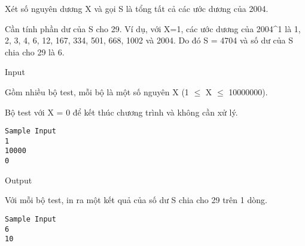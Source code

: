 



   Xét số nguyên dương X và gọi S là tổng tất cả các ước dương của 2004\textasciicircumX .  

   Cần tính phần dư của S cho 29. Ví dụ, với X=1, các ước dương của 2004\textasciicircum1 là 1, 2, 3, 4, 6, 12, 167, 334, 501, 668, 1002 và 2004. Do đó S = 4704  và số dư của S chia cho 29 là 6.  

       Input     

   Gồm nhiều bộ test, mỗi bộ là một số nguyên X (1  $\le$  X  $\le$  10000000).  

   Bộ test với X = 0 để kết thúc chương trình và không cần xử lý.  
\begin{verbatim}
Sample Input
1 
10000 
0
\end{verbatim}     Output    



   Với mỗi bộ test, in ra một kết quả của số dư S chia cho 29 trên 1 dòng.  
\begin{verbatim}
Sample Input
6 
10 
\end{verbatim}
